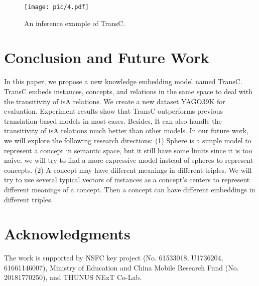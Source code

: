\documentclass[11pt,a4paper]{article}
\begin{document}
  \begin{figure}[ht]
    \centering
    \setlength{\abovecaptionskip}{2pt}
    \setlength{\belowcaptionskip}{0pt}
    \texttt{[image: pic/4.pdf]}\\
    \caption{An inference example of TransC.}
    \label{fig3}
    \end{figure} 
  
  \section{Conclusion and Future Work}
  
  In this paper, we propose a new knowledge embedding model named TransC. TransC embeds instances, concepts, and relations in the same space
  to deal with the transitivity of isA relations. We create a new dataset YAGO39K for evaluation. Experiment results show that 
  TransC outperforms previous translation-based models in most cases. Besides, It can also handle the transitivity of isA relations
  much better than other models. In our future work, we will explore the following research directions:
  (1) Sphere is a simple model to represent a concept in semantic space, but it still have some limits since it is too naive.
  we will try to find a more expressive model instead of spheres to represent concepts. (2) A concept may have 
  different meanings in different triples. We will try to use several typical vectors of instances as a concept's centers
  to represent different meanings of a concept. Then a concept can have different embeddings in different triples.
  
  \section*{Acknowledgments}
  
  The work is supported by NSFC key project (No. 61533018, U1736204, 61661146007), Ministry of Education and China Mobile Research Fund (No. 20181770250), and THUNUS NExT Co-Lab.
  
  
  
  
  \appendix
  
  
\end{document}
